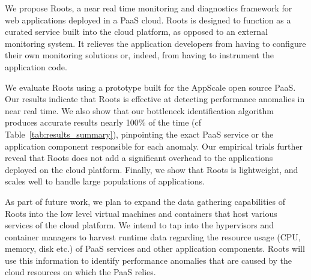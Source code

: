 We propose Roots, a near real time monitoring and diagnostics
framework for web applications deployed in a PaaS cloud. 
Roots is designed to function as a curated service
built into the cloud platform, as opposed to an external monitoring system. 
It relieves the application developers from having to configure
their own monitoring solutions or, indeed,
from having to instrument the application code.


We evaluate Roots using a prototype built for the AppScale open source PaaS. 
Our results indicate that Roots is effective at detecting performance anomalies
in near real time. We also show that our bottleneck identification algorithm
produces accurate results nearly 100\% of the time (cf
Table~\ref{tab:results_summary}), pinpointing the exact PaaS
service or the application component responsible for each anomaly. Our empirical trials further 
reveal that Roots does not add a significant overhead to the applications deployed
on the cloud platform. Finally, we show that Roots is lightweight, 
and scales well to handle large populations of applications. 

As part of future work, we plan to expand the data gathering capabilities of Roots into
the low level virtual machines and containers that host various services of the cloud
platform. We intend to tap into the hypervisors
and container managers to harvest runtime data 
regarding the resource usage (CPU, memory, disk etc.) of
PaaS services and other application components. Roots will use
this information to identify performance anomalies that are caused by
the cloud resources on which the PaaS relies.


